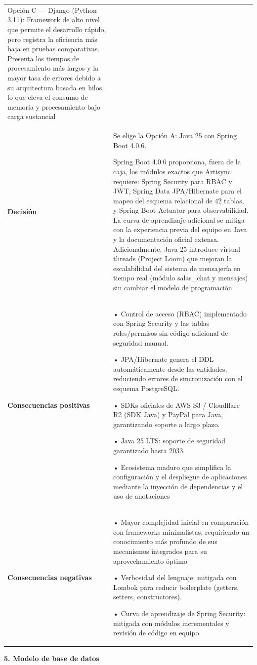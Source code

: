 \documentclass[
]{article}
\begin{document}
\begin{longtable}[]{@{}
  >{\raggedright\arraybackslash}p{}
  >{\raggedright\arraybackslash}p{}@{}}
Opción C --- Django (Python 3.11): Framework de alto nivel que permite
el desarrollo rápido, pero registra la eficiencia más baja en pruebas
comparativas. Presenta los tiempos de procesamiento más largos y la
mayor tasa de errores debido a su arquitectura basada en hilos, lo que
eleva el consumo de memoria y procesamiento bajo carga sustancial \\
\textbf{Decisión} & Se elige la Opción A: Java 25 con Spring Boot 4.0.6.

Spring Boot 4.0.6 proporciona, fuera de la caja, los módulos exactos que
Artisync requiere: Spring Security para RBAC y JWT, Spring Data
JPA/Hibernate para el mapeo del esquema relacional de 42 tablas, y
Spring Boot Actuator para observabilidad. La curva de aprendizaje
adicional se mitiga con la experiencia previa del equipo en Java y la
documentación oficial extensa. Adicionalmente, Java 25 introduce virtual
threads (Project Loom) que mejoran la escalabilidad del sistema de
mensajería en tiempo real (módulo salas\_chat y mensajes) sin cambiar el
modelo de programación. \\
\textbf{Consecuencias positivas} & • Control de acceso (RBAC)
implementado con Spring Security y las tablas roles/permisos sin código
adicional de seguridad manual.

• JPA/Hibernate genera el DDL automáticamente desde las entidades,
reduciendo errores de sincronización con el esquema PostgreSQL.

• SDKs oficiales de AWS S3 / Cloudflare R2 (SDK Java) y PayPal para
Java, garantizando soporte a largo plazo.

• Java 25 LTS: soporte de seguridad garantizado hasta 2033.

• Ecosistema maduro que simplifica la configuración y el despliegue de
aplicaciones mediante la inyección de dependencias y el uso de
anotaciones \\
\textbf{Consecuencias negativas} & • Mayor complejidad inicial en
comparación con frameworks minimalistas, requiriendo un conocimiento más
profundo de sus mecanismos integrados para su aprovechamiento óptimo

• Verbosidad del lenguaje: mitigada con Lombok para reducir boilerplate
(getters, setters, constructores).

• Curva de aprendizaje de Spring Security: mitigada con módulos
incrementales y revisión de código en equipo. \\
\end{longtable}

\textbf{5. Modelo de base de datos}
\end{document}
